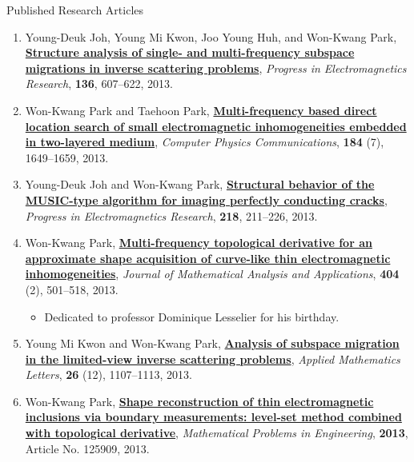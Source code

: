 \documentclass{resume} %
\begin{document}
\begin{rSection}{Published Research Articles}
\begin{enumerate}
\item\label{A-PIER2013A} Young-Deuk Joh, Young Mi Kwon, Joo Young Huh, and Won-Kwang Park, \href{http://dx.doi.org/10.2528/PIER12120313}{\textbf{Structure analysis of single- and multi-frequency subspace migrations in inverse scattering problems}}, \textit{Progress in Electromagnetics Research}, \textbf{136}, 607--622, 2013.
\item\label{A-CPC2013} Won-Kwang Park and Taehoon Park, \href{http://dx.doi.org/10.1016/j.cpc.2013.02.008}{\textbf{Multi-frequency based direct location search of small electromagnetic inhomogeneities embedded in two-layered medium}}, \textit{Computer Physics Communications}, \textbf{184} (7), 1649--1659, 2013.
\item\label{A-PIER2013B} Young-Deuk Joh and Won-Kwang Park, \href{http://dx.doi.org/10.2528/PIER13013104}{\textbf{Structural behavior of the MUSIC-type algorithm for imaging perfectly conducting cracks}}, \textit{Progress in Electromagnetics Research}, \textbf{218}, 211--226, 2013.
\item\label{A-JMMA2013} Won-Kwang Park, \href{http://dx.doi.org/10.1016/j.jmaa.2013.03.040}{\textbf{Multi-frequency topological derivative for an approximate shape acquisition of curve-like thin electromagnetic inhomogeneities}}, \textit{Journal of Mathematical Analysis and Applications}, \textbf{404} (2), 501--518, 2013.
    \begin{itemize}
      \item Dedicated to professor Dominique Lesselier for his  birthday.
    \end{itemize}
\item\label{A-AML2013} Young Mi Kwon and Won-Kwang Park, \href{http://dx.doi.org/10.1016/j.aml.2013.05.015}{\textbf{Analysis of subspace migration in the limited-view inverse scattering problems}}, \textit{Applied Mathematics Letters}, \textbf{26} (12), 1107--1113, 2013.
\item\label{A-MPE2013} Won-Kwang Park, \href{http://dx.doi.org/10.1155/2013/125909}{\textbf{Shape reconstruction of thin electromagnetic inclusions via boundary measurements: level-set method combined with topological derivative}}, \textit{Mathematical Problems in Engineering}, \textbf{2013}, Article No. 125909, 2013.

\end{enumerate}
\end{rSection}
\end{document}
